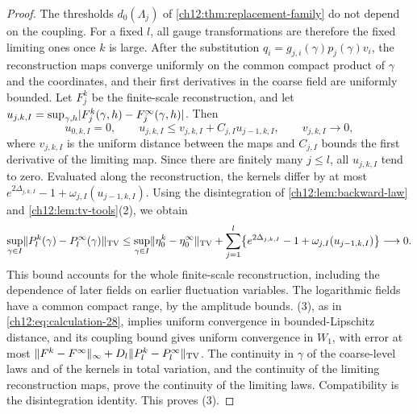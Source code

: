 \begin{proof}
The thresholds $d_0(\Lambda_j)$ of \cref{ch12:thm:replacement-family} do not depend on the coupling. For a fixed $l$, all gauge transformations are therefore the fixed limiting ones once $k$ is large. After the substitution $q_i=g_{j,i}(\gamma)p_j(\gamma)v_i$, the reconstruction maps converge uniformly on the common compact product of $\gamma$ and the coordinates, and their first derivatives in the coarse field are uniformly bounded. Let $F_j^k$ be the finite-scale reconstruction, and let $u_{j,k,I}=\sup_{\gamma,h}\lvert F_j^k(\gamma,h)-F_j^\infty(\gamma,h)\rvert$. Then
\begin{equation}\label{ch12:eq:compact-coupling-reconstruction}
 u_{0,k,I}=0,\qquad u_{j,k,I}\le v_{j,k,I}+C_{j,I}u_{j-1,k,I},\qquad v_{j,k,I}\longrightarrow0,
\end{equation}
where $v_{j,k,I}$ is the uniform distance between the maps and $C_{j,I}$ bounds the first derivative of the limiting map. Since there are finitely many $j\le l$, all $u_{j,k,I}$ tend to zero. Evaluated along the reconstruction, the kernels differ by at most $e^{2\Delta_{j,k,I}}-1+\omega_{j,I}(u_{j-1,k,I})$. Using the disintegration of \cref{ch12:lem:backward-law} and \cref{ch12:lem:tv-tools}(2), we obtain
\begin{equation}\label{ch12:eq:compact-coupling-prefix-telescope}
 \sup_{\gamma\in I}\lVert P_l^k(\gamma)-P_l^\infty(\gamma)\rVert_{\operatorname{TV}}\le\sup_{\gamma\in I}\lVert \eta_0^k-\eta_0^\infty\rVert_{\operatorname{TV}}+\sum_{j=1}^l\bigl\{e^{2\Delta_{j,k,I}}-1+\omega_{j,I}(u_{j-1,k,I})\bigr\}\longrightarrow0 .
\end{equation}
This bound accounts for the whole finite-scale reconstruction, including the dependence of later fields on earlier fluctuation variables. The logarithmic fields have a common compact range, by the amplitude bounds. (3), as in \eqref{ch12:eq:calculation-28}, implies uniform convergence in bounded-Lipschitz distance, and its coupling bound gives uniform convergence in $W_1$, with error at most $\lVert F^k-F^\infty\rVert_\infty+D_l\lVert P_l^k-P_l^\infty\rVert_{\operatorname{TV}}$. The continuity in $\gamma$ of the coarse-level laws and of the kernels in total variation, and the continuity of the limiting reconstruction maps, prove the continuity of the limiting laws. Compatibility is the disintegration identity. This proves (3).
\end{proof}
